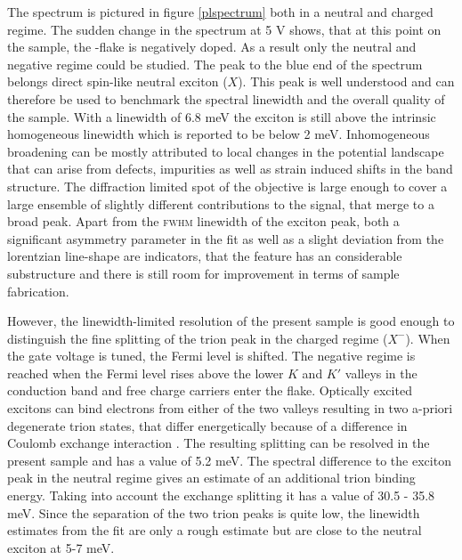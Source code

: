 The \pl spectrum is pictured in figure \ref{plspectrum} both in a neutral and charged regime. The sudden change in the spectrum at 5 V shows, that at this point on the sample, the \tmd-flake is negatively doped. As a result only the neutral and negative regime could be studied. The peak to the blue end of the spectrum belongs direct spin-like neutral exciton ($X$). This peak is well understood and can therefore be used to benchmark the spectral linewidth and the overall quality of the sample. With a linewidth of 6.8 meV the exciton is still above the intrinsic homogeneous linewidth which is reported to be below 2 meV\cite{moody_intrinsic_2015, ajayi_approaching_2017}. Inhomogeneous broadening can be mostly attributed to local changes in the potential landscape that can arise from defects, impurities as well as strain induced shifts in the band structure\cite{zhu_strain_2013}. The diffraction limited spot of the objective is large enough to cover a large ensemble of slightly different contributions to the \pl signal, that merge to a broad peak. Apart from the \textsc{fwhm} linewidth of the exciton peak, both a significant asymmetry parameter in the fit as well as a slight deviation from the lorentzian line-shape are indicators, that the feature has an considerable substructure and there is still room for improvement in terms of sample fabrication.

However, the linewidth-limited resolution of the present sample is good enough to distinguish the fine splitting of the trion peak in the charged regime ($X^-$). When the gate voltage is tuned, the Fermi level is shifted. The negative regime is reached when the Fermi level rises above the lower $K$ and $K'$ valleys in the conduction band and free charge carriers enter the flake. Optically excited excitons can bind electrons from either of the two valleys resulting in two a-priori degenerate trion states, that differ energetically because of a difference in Coulomb exchange interaction \cite{courtade_charged_2017}. The resulting splitting can be resolved in the present sample and has a value of 5.2 meV. The spectral difference to the exciton peak in the neutral regime gives an estimate of an additional trion binding energy. Taking into account the exchange splitting it has a value of 30.5 - 35.8 meV. Since the separation of the two trion peaks is quite low, the linewidth estimates from the fit are only a rough estimate but are close to the neutral exciton at 5-7 meV.

